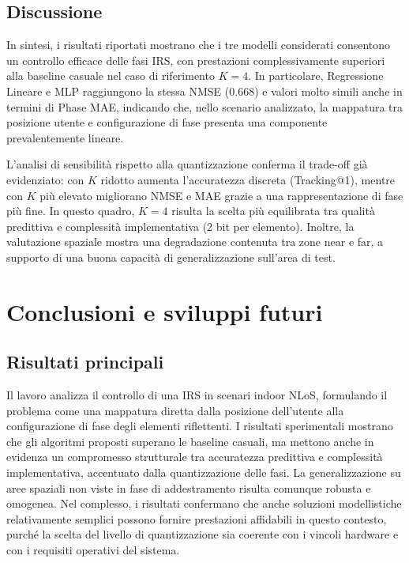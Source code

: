\documentclass[12pt,a4paper]{report}
\begin{document}
\section{Discussione}
In sintesi, i risultati riportati mostrano che i tre modelli
considerati consentono un controllo efficace delle fasi IRS, con
prestazioni complessivamente superiori alla baseline casuale nel caso
di riferimento $K=4$. In particolare, Regressione Lineare e MLP
raggiungono la stessa NMSE (0.668) e valori molto simili anche in
termini di Phase MAE, indicando che, nello scenario analizzato, la
mappatura tra posizione utente e configurazione di fase presenta una
componente prevalentemente lineare.

L'analisi di sensibilità rispetto alla quantizzazione conferma il
trade-off già evidenziato: con $K$ ridotto aumenta l'accuratezza
discreta (Tracking@1), mentre con $K$ più elevato migliorano NMSE e
MAE grazie a una rappresentazione di fase più fine. In questo quadro,
$K=4$ risulta la scelta più equilibrata tra qualità predittiva e
complessità implementativa (2 bit per elemento). Inoltre, la
valutazione spaziale mostra una degradazione contenuta tra zone near
e far, a supporto di una buona capacità di generalizzazione sull'area di test.

\chapter{Conclusioni e sviluppi futuri}
\label{chap:conclusioni}

\section{Risultati principali}
Il lavoro analizza il controllo di una IRS in scenari indoor NLoS,
formulando il problema come una mappatura diretta dalla posizione
dell'utente alla configurazione di fase degli elementi riflettenti. I
risultati sperimentali mostrano che gli algoritmi proposti superano
le baseline casuali, ma mettono anche in evidenza un compromesso
strutturale tra accuratezza predittiva e complessità implementativa,
accentuato dalla quantizzazione delle fasi. La generalizzazione su
aree spaziali non viste in fase di addestramento risulta comunque
robusta e omogenea. Nel complesso, i risultati confermano che anche
soluzioni modellistiche relativamente semplici possono fornire
prestazioni affidabili in questo contesto, purché la scelta del livello
di quantizzazione sia coerente con i vincoli hardware e con i requisiti
operativi del sistema.
\end{document}
